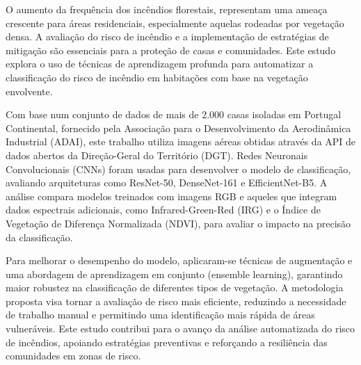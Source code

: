 
%
O aumento da frequência dos incêndios florestais, representam uma ameaça crescente 
para áreas residenciais, 
especialmente aquelas rodeadas por vegetação densa. A avaliação do 
risco de incêndio e a implementação de estratégias de mitigação são essenciais 
para a proteção de casas e comunidades. Este estudo explora o uso de técnicas de 
aprendizagem profunda para automatizar a classificação do risco de incêndio em 
habitações com base na vegetação envolvente.

Com base num conjunto de dados de mais de 2.000 casas isoladas em Portugal Continental, 
fornecido pela Associação para o Desenvolvimento da Aerodinâmica Industrial (ADAI), 
este trabalho utiliza imagens aéreas obtidas através da API de dados abertos da 
Direção-Geral do Território (DGT). Redes Neuronais Convolucionais (CNNs) foram 
usadas para desenvolver o modelo de classificação, avaliando arquiteturas 
como ResNet-50, DenseNet-161 e EfficientNet-B5. A análise compara modelos 
treinados com imagens RGB e aqueles que integram dados espectrais adicionais, 
como Infrared-Green-Red (IRG) e o Índice de Vegetação de Diferença Normalizada 
(NDVI), para avaliar o impacto na precisão da classificação.

Para melhorar o desempenho do modelo, aplicaram-se técnicas de augmentação 
e uma abordagem de aprendizagem em conjunto (ensemble learning), garantindo maior 
robustez na classificação de diferentes tipos de vegetação. A metodologia proposta 
visa tornar a avaliação de risco mais eficiente, reduzindo a necessidade de 
trabalho manual e permitindo uma identificação mais rápida de áreas vulneráveis. 
Este estudo contribui para o avanço da análise automatizada do risco de incêndios, 
apoiando estratégias preventivas e reforçando a resiliência das comunidades em zonas de risco.

